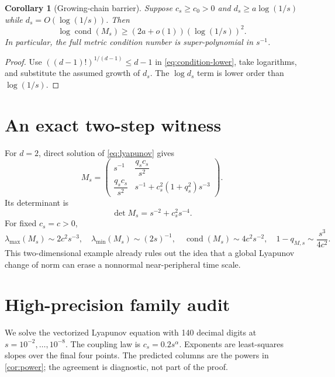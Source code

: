 \documentclass[11pt]{article}
\newtheorem{corollary}[theorem]{Corollary}
\newcommand{\cond}{\operatorname{cond}}
\begin{document}
\begin{corollary}[Growing-chain barrier]
\label{cor:growing}
Suppose $c_s\ge c_0>0$ and
$d_s\ge a\log(1/s)$ while $d_s=O(\log(1/s))$.  Then
\begin{equation}
 \log\cond(M_s)\ge
 (2a+o(1))(\log(1/s))^2.
 \label{eq:superpoly}
\end{equation}
In particular, the full metric condition number is super-polynomial in
$s^{-1}$.
\end{corollary}

\begin{proof}
Use $((d-1)!)^{1/(d-1)}\le d-1$ in
\eqref{eq:condition-lower}, take logarithms, and substitute the assumed
growth of $d_s$.  The $\log d_s$ term is lower order than
$\log(1/s)$.
\end{proof}

\section{An exact two-step witness}
\label{sec:two-step}

For $d=2$, direct solution of \eqref{eq:lyapunov} gives
\begin{equation}
 M_s=
 \begin{pmatrix}
 s^{-1} & \dfrac{q_sc_s}{s^2}\\
 \dfrac{q_sc_s}{s^2} & s^{-1}+c_s^2(1+q_s^2)s^{-3}
 \end{pmatrix}.
 \label{eq:two-step}
\end{equation}
Its determinant is
\begin{equation}
 \det M_s=s^{-2}+c_s^2s^{-4}.
 \label{eq:two-det}
\end{equation}
For fixed $c_s=c>0$,
\begin{equation}
 \lambda_{\max}(M_s)\sim2c^2s^{-3},\quad
 \lambda_{\min}(M_s)\sim(2s)^{-1},\quad
 \cond(M_s)\sim4c^2s^{-2},\quad
 1-q_{M,s}\sim\frac{s^3}{4c^2}.
 \label{eq:two-asymptotic}
\end{equation}
This two-dimensional example already rules out the idea that a global
Lyapunov change of norm can erase a nonnormal near-peripheral time scale.

\section{High-precision family audit}
\label{sec:audit}

We solve the vectorized Lyapunov equation with 140 decimal digits at
$s=10^{-2},\ldots,10^{-8}$.  The coupling law is
$c_s=0.2s^\alpha$.  Exponents are least-squares slopes over the final four
points.  The predicted columns are the powers in \cref{cor:power}; the
agreement is diagnostic, not part of the proof.
\end{document}
